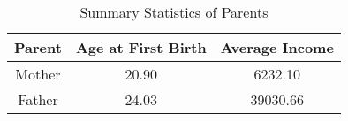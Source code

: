 \begin{table}

\caption{\label{tab:tab:parents_stats}Summary Statistics of Parents}
\centering
\begin{tabular}[t]{ccc}
\toprule
Parent & Age at First Birth & Average Income\\
\midrule
Mother & 20.90 & 6232.10\\
Father & 24.03 & 39030.66\\
\bottomrule
\end{tabular}
\end{table}
